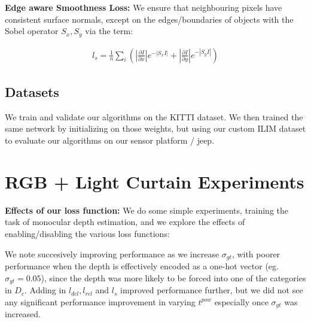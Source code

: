 \textbf{Edge aware Smoothness Loss:} We ensure that neighbouring pixels have consistent surface normals, except on the edges/boundaries of objects with the Sobel operator $S_{x}, S_{y}$ via the term:

\small
\begin{align}
    l_{s}=\frac{1}{n}\sum_{i}\left(\left|\frac{\partial I}{\partial x}\right|e^{-|S_{x}I|}+\left|\frac{\partial I}{\partial y}\right|e^{-|S_{y}I|}\right)
   \label{eq:smooth} 
\end{align}
\normalsize

\subsection{Datasets}

We train and validate our algorithms on the KITTI dataset. We then trained the same network by initializing on those weights, but using our custom ILIM dataset to evaluate our algorithms on our sensor platform / jeep.

\section{RGB + Light Curtain Experiments}

\textbf{Effects of our loss function:} We do some simple experiments, training the task of monocular depth estimation, and we explore the effects of enabling/disabling the various loss functions:

\noindent
\begin{table}[h]
   \centering
   \caption{Effects of various loss functions for the baseline of Monocular Depth Estimation only}
   \label{table:xx}
\end{table}

We note succesively improving performance as we increase $\sigma_{gt}$, with poorer performance when the depth is effectively encoded as a one-hot vector (eg. $\sigma_{gt}=0.05$), since the depth was more likely to be forced into one of the categories in $D_{c}$. Adding in $l_{dcl}, l_{rcl}$ and $l_{s}$ improved performance further, but we did not see any significant performance improvement in varying $t^{pow}$ especially once $\sigma_{gt}$ was increased.


